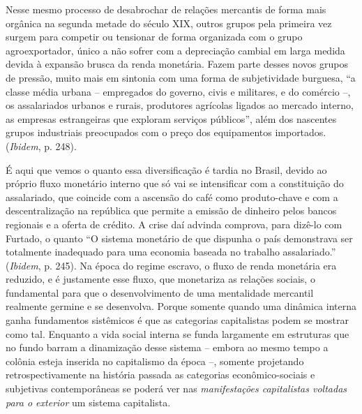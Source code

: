Nesse mesmo processo de desabrochar de relações mercantis de forma mais
orgânica na segunda metade do século XIX, outros grupos pela primeira
vez surgem para competir ou tensionar de forma organizada com o grupo
agroexportador, único a não sofrer com a depreciação cambial em larga
medida devida à expansão brusca da renda monetária. Fazem parte desses
novos grupos de pressão, muito mais em sintonia com uma forma de
subjetividade burguesa, ``a classe média urbana -- empregados do
governo, civis e militares, e do comércio --, os assalariados urbanos e
rurais, produtores agrícolas ligados ao mercado interno, as empresas
estrangeiras que exploram serviços públicos'', além dos nascentes grupos
industriais preocupados com o preço dos equipamentos importados.
(\emph{Ibidem}, p. 248).

É aqui que vemos o quanto essa diversificação é tardia no Brasil, devido
ao próprio fluxo monetário interno que só vai se intensificar com a
constituição do assalariado, que coincide com a ascensão do café como
produto-chave e com a descentralização na república que permite a
emissão de dinheiro pelos bancos regionais e a oferta de crédito. A
crise daí advinda comprova, para dizê-lo com Furtado, o quanto ``O
sistema monetário de que dispunha o país demonstrava ser totalmente
inadequado para uma economia baseada no trabalho assalariado.''
(\emph{Ibidem}, p. 245). Na época do regime escravo, o fluxo de renda
monetária era reduzido, e é justamente esse fluxo, que monetariza as
relações sociais, o fundamental para que o desenvolvimento de uma
mentalidade mercantil realmente germine e se desenvolva. Porque somente
quando uma dinâmica interna ganha fundamentos sistêmicos é que as
categorias capitalistas podem se mostrar como tal. Enquanto a vida
social interna se funda largamente em estruturas que no fundo barram a
dinamização desse sistema -- embora ao mesmo tempo a colônia esteja
inserida no capitalismo da época --, somente projetando
retrospectivamente na história passada as categorias econômico-sociais e
subjetivas contemporâneas se poderá ver nas \emph{manifestações
capitalistas voltadas para o exterior} um sistema capitalista.

